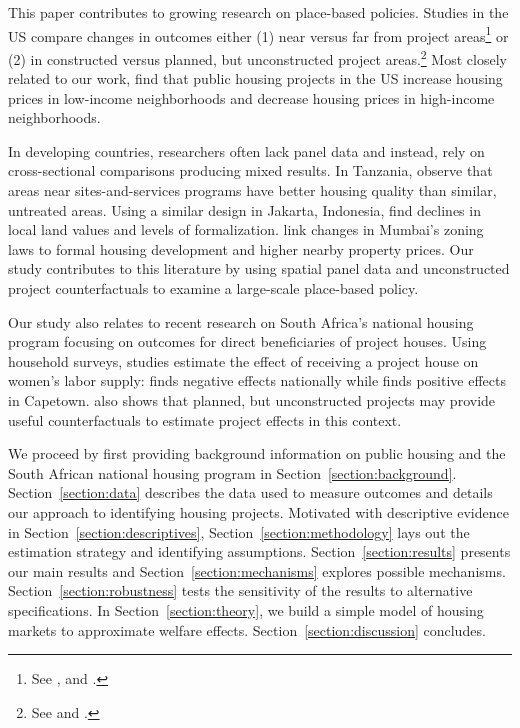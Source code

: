 \documentclass[12pt]{article}
\begin{document}
This paper contributes to growing research on place-based policies.  Studies in the US compare changes in outcomes either (1) near versus far from project areas\footnote{See \cite{rossi2010housing,hornbeck2017creative}, and \cite{diamond2019wants}.} or (2) in constructed versus planned, but unconstructed project areas.\footnote{See \cite{busso2013assessing} and \cite{kline2013local}.}  Most closely related to our work, \cite{diamond2019wants} find that public housing projects in the US increase housing prices in low-income neighborhoods and decrease housing prices in high-income neighborhoods.  

In developing countries, researchers often lack panel data and instead, rely on cross-sectional comparisons producing mixed results.  In Tanzania, \cite{baruah2017planning} observe that areas near sites-and-services programs have better housing quality than similar, untreated areas.  Using a similar design in Jakarta, Indonesia, \cite{harari2018slum} find declines in local land values and levels of formalization.  \cite{gechter2018slums} link changes in Mumbai's zoning laws to formal housing development and higher nearby property prices.  Our study contributes to this literature by using spatial panel data and unconstructed project counterfactuals to examine a large-scale place-based policy.

Our study also relates to recent research on South Africa's national housing program focusing on outcomes for direct beneficiaries of project houses.  Using household surveys, studies estimate the effect of receiving a project house on women's labor supply: \cite{picarelli2019there}  finds negative effects nationally while \cite{franklin2020enabled} finds positive effects in Capetown.  \cite{franklin2020enabled} also shows that planned, but unconstructed projects may provide useful counterfactuals to estimate project effects in this context.


We proceed by first providing background information on public housing and the South African national housing program in Section~\ref{section:background}.  Section~\ref{section:data} describes the data used to measure outcomes and details our approach to identifying housing projects. Motivated with descriptive evidence in Section~\ref{section:descriptives}, Section~\ref{section:methodology} lays out the estimation strategy and identifying assumptions. Section~\ref{section:results} presents our main results and Section~\ref{section:mechanisms} explores possible mechanisms.  Section~\ref{section:robustness} tests the sensitivity of the results to alternative specifications.  In Section~\ref{section:theory}, we build a simple model of housing markets to approximate welfare effects.   Section~\ref{section:discussion} concludes.
\end{document}
